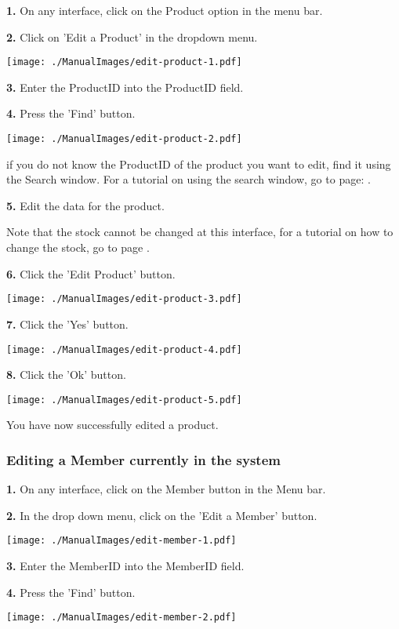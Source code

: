 \textbf{1.} On any interface, click on the Product option in the menu bar.

\textbf{2.} Click on 'Edit a Product' in the dropdown menu.

\texttt{[image: ./ManualImages/edit-product-1.pdf]}

\textbf{3.} Enter the ProductID into the ProductID field. 

\textbf{4.} Press the 'Find' button.

\texttt{[image: ./ManualImages/edit-product-2.pdf]}

if you do not know the ProductID of the product you want to edit, find it using the Search window. For a tutorial on using the search window, go to page: . 

\textbf{5.} Edit the data for the product.

Note that the stock cannot be changed at this interface, for a tutorial on how to change the stock, go to page .

\textbf{6.} Click the 'Edit Product' button.

\texttt{[image: ./ManualImages/edit-product-3.pdf]}

\textbf{7.} Click the 'Yes' button.

\texttt{[image: ./ManualImages/edit-product-4.pdf]}

\textbf{8.} Click the 'Ok' button.

\texttt{[image: ./ManualImages/edit-product-5.pdf]}

You have now successfully edited a product.


\pagebreak
\subsubsection{Editing a Member currently in the system}
\label{fig:Editing a Member currently in the system}

\textbf{1.} On any interface, click on the Member button in the Menu bar.

\textbf{2.} In the drop down menu, click on the 'Edit a Member' button.

\texttt{[image: ./ManualImages/edit-member-1.pdf]}

\textbf{3.} Enter the MemberID into the MemberID field. 

\textbf{4.} Press the 'Find' button.

\texttt{[image: ./ManualImages/edit-member-2.pdf]}

